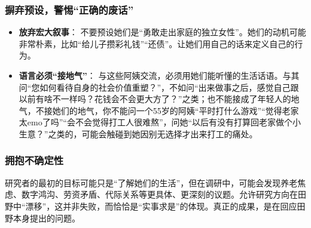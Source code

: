 \documentclass[UTF8]{ctexart}
\begin{document}
\subsubsection{摒弃预设，警惕“正确的废话”}
\begin{itemize}[label=\textbullet, leftmargin=*]
    \item \textbf{放弃宏大叙事}： 不要预设她们是“勇敢走出家庭的独立女性”。她们的动机可能非常朴素，比如“给儿子攒彩礼钱”“还债”。让她们用自己的话来定义自己的行为。
    \item \textbf{语言必须“接地气”}： 与这些阿姨交流，必须用她们能听懂的生活话语。与其问“您如何看待自身的社会价值重塑？”，不如问“出来做事之后，感觉自己跟以前有啥不一样吗？花钱会不会更大方了？”之类；也不能接成了年轻人的地气，不接她们的地气，你不能问一个55岁的阿姨“平时打什么游戏”“觉得老家太emo了吗”“会不会觉得打工人很难熬”，问她“以后有没有打算回老家做个小生意？”之类的，可能会触碰到她因别无选择才出来打工的痛处。
\end{itemize}

\subsubsection{拥抱不确定性}
研究者的最初的目标可能只是“了解她们的生活”，但在调研中，可能会发现养老焦虑、数字鸿沟、劳资矛盾、代际关系等更具体、更深刻的议题。允许研究方向在田野中“漂移”，这并非失败，而恰恰是“实事求是”的体现。真正的成果，是在回应田野本身提出的问题。
\end{document}
